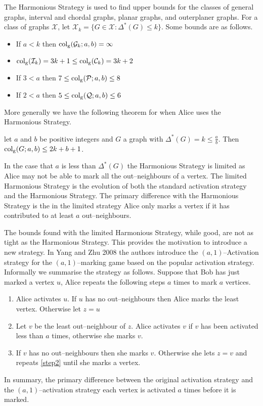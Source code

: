 The Harmonious Strategy is used to find upper bounds for the classes of general graphs, interval and chordal graphs, planar graphs, and outerplaner graphs. For a class of graphs $\mathcal{X}$, let $\mathcal{X}_k= \{G\in\mathcal{X}: \Delta^*(G)\leq k\}$. Some bounds are as follows.    
\begin{itemize}
    \item If $a < k$ then $\operatorname{col_g}(\mathcal{G}_k;a,b)=\infty$
    \item $\operatorname{col_g}(\mathcal{I}_k)=3k+1\leq\operatorname{col_g}(\mathcal{C}_k)=3k+2$
    \item If $3<a $ then $7\leq \operatorname{col_g}(\mathcal{P};a,b)\leq 8$
    \item If $2< a$ then $5\leq \operatorname{col_g}(\mathcal{Q};a,b)\leq 6$
\end{itemize}
More generally we have the following theorem for when Alice uses the Harmonious Strategy.
\begin{theorem}
    let $a$ and $b$ be positive integers and $G$ a graph with $\Delta^*(G)=k\leq\frac{a}{b}$. Then $\operatorname{col_g}(G;a,b)\leq 2k+b+1$.
\end{theorem}

In the case that $a$ is less than $\Delta^*(G)$ the Harmonious Strategy is limited as Alice may not be able to mark all the out--neighbours of a vertex. The limited Harmonious Strategy is the evolution of both the standard activation strategy and the Harmonious Strategy. The primary difference with the Harmonious Strategy is the in the limited strategy Alice only marks a vertex if it has contributed to at least $a$ out--neighbours.    

The bounds found with the limited Harmonious Strategy, while good, are not as tight as the Harmonious Strategy. This provides the motivation to introduce a new strategy. In Yang and Zhu 2008 \cite{yangZhu2008} the authors introduce the $(a,1)$--Activation strategy for the $(a,1)$--marking game based on the popular activation strategy. Informally we summarise the strategy as follows. Suppose that Bob has just marked a vertex $u$, Alice repeats the following steps $a$ times to mark $a$ vertices.
\begin{enumerate}
    \item Alice activates $u$. If $u$ has no out--neighbours then Alice marks the least vertex. Otherwise let $z=u$
    
    \item Let $v$ be the least out--neighbour of $z$. Alice activates $v$ if $v$ has been activated less than $a$ times, otherwise she marks $v$. \label{step2}
    
    \item If $v$ has no out--neighbours then she marks $v$. Otherwise she lets $z=v$ and repeats \ref{step2} until she marks a vertex.     
\end{enumerate}
In summary, the primary difference between the original activation strategy and the $(a,1)$--activation strategy each vertex is activated $a$ times before it is marked.

